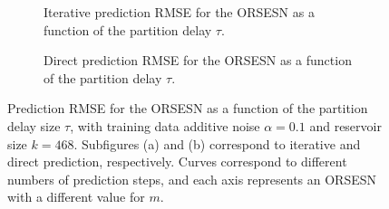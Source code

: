 \begin{figure}
    \centering
    \begin{subfigure}{\textwidth}
        \centering
        \caption{Iterative prediction RMSE for the ORSESN as a function of the partition delay $\tau$.}
        \label{fig:ORSESN_delay_iterative}
    \end{subfigure}

    \vspace{0em}

    \begin{subfigure}{\textwidth}
        \centering
        \caption{Direct prediction RMSE for the ORSESN as a function of the partition delay $\tau$.}
        \label{fig:ORSESN_delay_direct}
    \end{subfigure}

    \caption{Prediction RMSE for the ORSESN as a function of the partition delay size $\tau$, with training data additive noise $\alpha=0.1$ and reservoir size $k=468$. Subfigures (a) and (b) correspond to iterative and direct prediction, respectively. Curves correspond to different numbers of prediction steps, and each axis represents an ORSESN with a different value for $m$.}
    \label{fig:ORSESN_delay_combined}
\end{figure}


